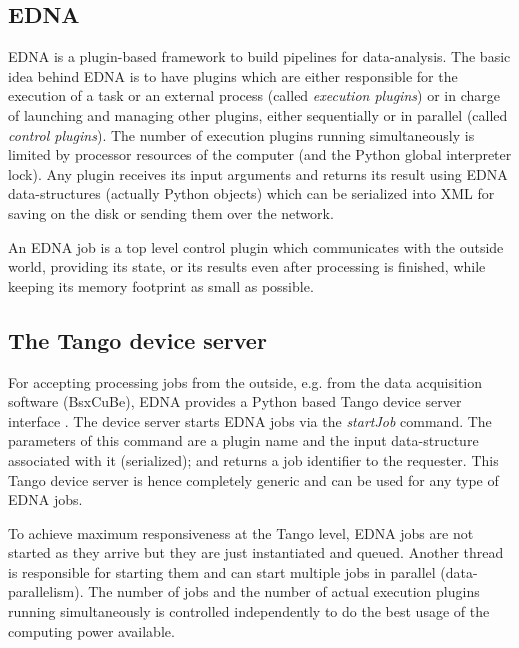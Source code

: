 \documentclass[preprint,pdf]{iucr}              %
\begin{document}


\subsection{EDNA}
EDNA is a plugin-based framework to build pipelines for data-analysis.
The basic idea behind EDNA is to have plugins which are either responsible for the execution
of a task or an external process (called \textit{execution plugins}) or in
charge of launching and managing other plugins, either sequentially or in
parallel (called \textit{control plugins}).
The number of execution plugins running simultaneously is limited by processor
resources of the computer (and the Python global interpreter lock).
Any plugin receives its input arguments and returns its result using
EDNA data-structures (actually Python objects) which can be serialized into XML
for saving on the disk or sending them over the network.

An EDNA job is a top level control plugin which communicates with the outside
world, providing its state, or its results even after processing is finished,
while keeping its memory footprint as small as possible.

\subsection{The Tango device server}
For accepting processing jobs from the outside, e.g. from the data
acquisition software (BsxCuBe), EDNA provides a Python based Tango device
server interface \cite{tango,pytango}.
The device server starts EDNA jobs via the \textit{startJob} command.
The parameters of this command are a plugin name and the input data-structure
associated with it (serialized); and returns a job identifier to the requester.
This Tango device server is hence completely generic and can be used for any
type of EDNA jobs.

To achieve maximum responsiveness at the Tango level, EDNA jobs are not started as
they arrive but they are just instantiated and queued.
Another thread is responsible for starting them and can start multiple jobs in parallel
(data-parallelism).
The number of jobs and the number of actual execution
plugins running simultaneously is controlled independently to do the best usage
of the computing power available.
\end{document}
